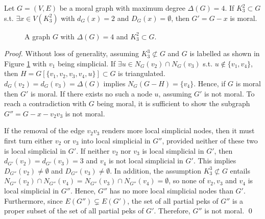 \begin{lemma}
\label{lm:2k3s}
Let $G=(V,E)$ be a moral graph with maximum degree $\Delta(G)=4$. If $K_3^2 \subset G$ s.t. $\exists x\in V(K_3^2)$ with $d_G(x)=2$ and $D_G(x)=\emptyset$, then $G'=G-x$ is moral.
\begin{figure}[H]
\centering
{}
\caption{A graph $G$ with $\Delta(G)=4$ and $K_3^2\subset G$.}
\label{fg:2k3s}
\end{figure}
\end{lemma}
\begin{proof}
Without loss of generality, assuming $K_3^3 \nsubset G$ and $G$ is labelled as shown in Figure \ref{fg:2k3s} with $v_1$ being simplicial. If $\exists u \in N_G(v_2)\cap N_G(v_3)$ s.t. $u \notin \{v_1,v_4\}$, then $H=G[\{v_1,v_2,v_3,v_4,u\}]\subset G$ is triangulated. $d_G(v_2)=d_G(v_3)=\Delta(G)$ implies $N_G(G-H)=\{v_4\}$. Hence, if $G$ is moral then $G'$ is moral. If there exists no such a node $u$, assuming $G'$ is not moral. To reach a contradiction with $G$ being moral, it is sufficient to show the subgraph $G''=G-x-v_2v_3$ is not moral. 

If the removal of the edge $v_2v_3$ renders more local simplicial nodes, then it must first turn either $v_2$ or $v_3$ into local simplicial in $G''$, provided neither of these two is local simplicial in $G'$. If neither $v_2$ nor $v_3$ is local simplicial in $G'$, then $d_{G'}(v_2)=d_{G'}(v_3)=3$ and $v_4$ is not local simplicial in $G'$. This implies $D_{G''}(v_2)\neq \emptyset$ and $D_{G''}(v_3) \neq \emptyset$. In addition, the assumption $K_3^3 \nsubset G$ entails $N_{G''}(v_2) \cap N_{G''}(v_4) = N_{G''}(v_3) \cap N_{G''}(v_4) = \emptyset$, so none of $v_2,v_3$ and $v_4$ is local simplicial in $G''$. Hence, $G''$ has no more local simplicial nodes than $G'$. Furthermore, since $E(G'') \subsetneq E(G')$, the set of all partial peks of $G''$ is a proper subset of the set of all partial peks of $G'$. Therefore, $G''$ is not moral. \qed
\end{proof}

